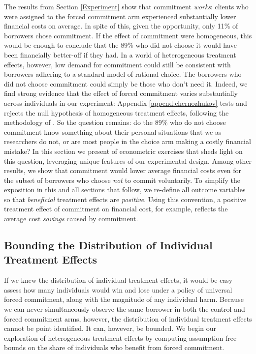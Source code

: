 \documentclass[ecta,nameyear,final]{econsocart}
\begin{document}
The results from Section \ref{Experiment} show that commitment \emph{works}: clients who were assigned to the forced commitment arm experienced substantially lower financial costs on average.
In spite of this, given the opportunity, only 11\% of borrowers chose commitment. 
If the effect of commitment were homogeneous, this would be enough to conclude that the 89\% who did not choose it would have been financially better-off if they had.
In a world of heterogeneous treatment effects, however, low demand for commitment could still be consistent with borrowers adhering to a standard model of rational choice. 
The borrowers who did not choose commitment could simply be those who don't need it. 
Indeed, we find strong evidence that the effect of forced commitment varies substantially across individuals in our experiment: Appendix \ref{append:chernozhukov} tests and rejects the null hypothesis of homogeneous treatment effects, following the methodology of \cite{chernozhukov2018generic}.
So the question remains: do the 89\% who do not choose commitment know something about their personal situations that we as researchers do not, or are most people in the choice arm making a costly financial mistake? 
In this section we present of econometric exercises that sheds light on this question, leveraging unique features of our experimental design. 
Among other results, we show that commitment would lower average financial costs even for the subset of borrowers who choose \emph{not} to commit voluntarily.
To simplify the exposition in this and all sections that follow, we re-define all outcome variables so that \emph{beneficial} treatment effects are \emph{positive}. Using this convention, a positive treatment effect of commitment on financial cost, for example, reflects the average cost \emph{savings} caused by commitment.

\subsection{Bounding the Distribution of Individual Treatment Effects}
\label{sec:bounds}
If we knew the distribution of individual treatment effects, it would be easy assess how many individuals would win and lose under a policy of universal forced commitment, along with the magnitude of any individual harm. 
Because we can never simultaneously observe the same borrower in both the control and forced commitment arms, however, the distribution of individual treatment effects cannot be point identified.
It can, however, be bounded.
We begin our exploration of heterogeneous treatment effects by computing assumption-free bounds on the share of individuals who benefit from forced commitment. 
\end{document}

